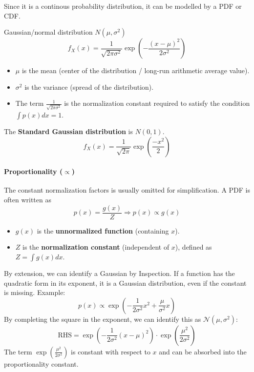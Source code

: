 \documentclass[../Probability.tex]{subfiles}
\begin{document}
\noindent Since it is a continous probability distribution, it can be modelled by a PDF or CDF.

\noindent Gaussian/normal distribution $N(\mu,\sigma^2)$
\[ f_X(x) = \frac{1}{\sqrt{2\pi\sigma^2}} \exp(-\frac{(x-\mu)^2}{2\sigma^2}) \]

\begin{itemize}
    \item $\mu$ is the mean (center of the distribution / long-run arithmetic average value).
    \item $\sigma^2$ is the variance (spread of the distribution).
    \item The term $\frac{1}{\sqrt{2\pi\sigma^2}}$ is the normalization constant required to satisfy the condition $\int p(x)dx = 1$.
\end{itemize}

\noindent The \textbf{Standard Gaussian distribution} is $N(0,1)$.
\[f_{X}(x)=\frac{1}{\sqrt{2\pi}}\exp(\frac{-x^2}{2})\]

\paragraph{Proportionality ($\propto$)}
The constant normalization factors is usually omitted for simplification. A PDF is often written as
\[
p(x) = \frac{g(x)}{Z} \Rightarrow p(x) \propto g(x)
\]
\begin{itemize}
    \item $g(x)$ is the \textbf{unnormalized function} (containing $x$).
    \item $Z$ is the \textbf{normalization constant} (independent of $x$), defined as $Z = \int g(x)dx$.
\end{itemize}

\noindent By extension, we can identify a Gaussian by Inspection.
If a function has the quadratic form in its exponent, it is a Gaussian distribution, even if the constant is missing. \newline
Example:
\[
p(x) \propto \exp\left( -\frac{1}{2\sigma^2}x^2 + \frac{\mu}{\sigma^2}x \right)
\]
By completing the square in the exponent, we can identify this as $\mathcal{N}(\mu, \sigma^2)$:
\[
\text{RHS} = \exp\left( -\frac{1}{2\sigma^2}(x - \mu)^2 \right) \cdot \exp\left( \frac{\mu^2}{2\sigma^2} \right)
\]
The term $\exp\left( \frac{\mu^2}{2\sigma^2} \right)$ is constant with respect to $x$ and can be absorbed into the proportionality constant.
\end{document}
